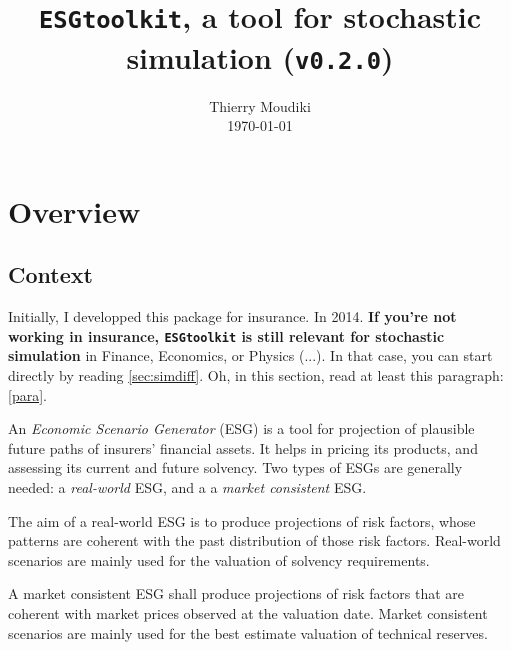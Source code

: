 \documentclass[a4paper]{article}\usepackage[]{graphicx}\usepackage[]{color}
\date{}
\newcommand{\code}[1]{\mbox{\texttt{#1}}}
\begin{document}
\title{\bf{\code{ESGtoolkit}, a tool for stochastic simulation (\code{v0.2.0})}} %
\author{
Thierry Moudiki\\ %
\today{}
}
\maketitle

\tableofcontents

\newpage

\section{Overview}

\subsection{Context}

Initially, I developped this package for insurance. In 2014. \textbf{If you're not working in insurance, \code{ESGtoolkit} is still relevant for stochastic simulation} in Finance, Economics, or Physics (...). In that case, you can start directly by reading \ref{sec:simdiff}. Oh, in this section, read at least this paragraph: \ref{para}. 

\medskip

An \textit{Economic Scenario Generator} (ESG) is a tool for projection of plausible future paths of insurers' financial assets. It helps in pricing its products, and assessing its current and future solvency. Two types of ESGs are generally needed: a \textit{real-world} ESG, and a  a \textit{market consistent} ESG.


\medskip

The aim of a real-world ESG is to produce projections of risk factors, whose patterns are  coherent with the past distribution of those risk factors. Real-world scenarios are mainly used for the valuation of solvency requirements.  

\medskip

A market consistent ESG shall produce projections of risk factors that are coherent with market prices observed at the valuation date. Market consistent scenarios are mainly used for the best estimate valuation of technical reserves. 


\medskip
\end{document}
